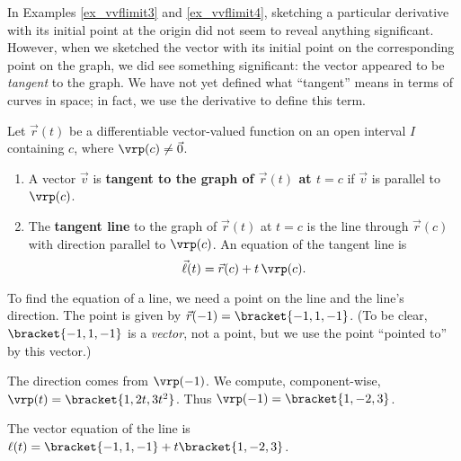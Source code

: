 In Examples \ref{ex_vvflimit3} and \ref{ex_vvflimit4}, sketching a particular derivative with its initial point at the origin did not seem to reveal anything significant. However, when we sketched the vector with its initial point on the corresponding point on the graph, we did see something significant: the vector appeared to be \textit{tangent} to the graph. We have not yet defined what ``tangent'' means in terms of curves in space; in fact, we use the derivative to define this term.

{Let $\vec r(t)$ be a differentiable vector-valued function on an open interval $I$ containing $c$, where $\vrp(c)\neq \vec 0$.
\begin{enumerate}
	\item A vector $\vec v$ is \textbf{tangent to the graph of $\vec r(t)$ at $t=c$} if $\vec v$ is parallel to $\vrp(c)$.
	\item	The \textbf{tangent line}  to the graph of $\vec r(t)$ at $t=c$ is the line through $\vec r(c)$ with direction parallel to $\vrp(c)$. An equation of the tangent line is 
	\[\vec \ell(t) = \vec r(c) + t\,\vrp(c).\]
\end{enumerate}}


{To find the equation of a line, we need a point on the line and the line's direction. The point is given by $\vec r(-1) =\bracket{-1,1,-1}$. (To be clear, $\bracket{-1,1,-1}$ is a \emph{vector}, not a point, but we use the point ``pointed to'' by this vector.)

The direction comes from $\vrp(-1)$. We compute, component-wise, $\vrp(t) =\bracket{1,2t, 3t^2}$. Thus $\vrp(-1) =\bracket{1,-2,3}$. 

The vector equation of the line is $\ell(t) =\bracket{-1,1,-1}+ t\bracket{1,-2,3}$. }

